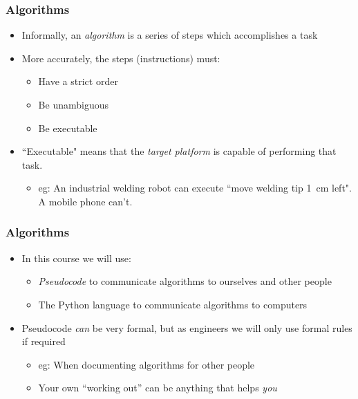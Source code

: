 \documentclass[14pt]{beamer}
\begin{document}

\begin{frame} %
\frametitle{Algorithms}
\begin{itemize}
\item Informally, an \textit{algorithm} is a series of steps which accomplishes a task
\item More accurately, the steps (instructions) must:
	\begin{itemize}
		\item Have a strict order
		\item Be unambiguous
		\item Be executable
	\end{itemize}
\item ``Executable" means that the \textit{target platform} is capable of performing that task.
	\begin{itemize}
		\item eg: An industrial welding robot can execute ``move welding tip 1~cm left". A mobile phone can't.
	\end{itemize}
\end{itemize}
\end{frame}

\begin{frame} %
\frametitle{Algorithms}
\begin{itemize}
\item In this course we will use:
	\begin{itemize}
	\item \textit{Pseudocode} to communicate algorithms to ourselves and other people
	\item The Python language to communicate algorithms to computers
	\end{itemize}
\item Pseudocode \textit{can} be very formal, but as engineers we will only use formal rules if required
	\begin{itemize}
		\item eg: When documenting algorithms for other people
		\item Your own ``working out'' can be anything that helps \textit{you}
	\end{itemize}
\end{itemize}
\end{frame}
\end{document}
